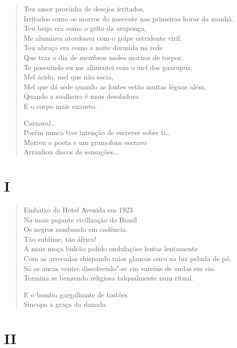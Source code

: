 \begin{verse}
Teu amor provinha de desejos irritados,\\
Irritados como os morros do nascente nas primeiras horas da manhã.\\
Teu beijo era como o grito da araponga,\\
Me alumiava atordoava com o golpe estridente viril.\\
Teu abraço era como a noite dormida na rede\\
Que traz o dia de membros moles mornos de torpor.\\
Te possuindo eu me alimentei com o mel dos guarupus,\\
Mel ácido, mel que não sacia,\\
Mel que dá sede quando as fontes estão muitas léguas além,\\
Quando a soalheira é mais desoladora\\
E o corpo mais exausto.

Carnaval\ldots{}\\
Porém nunca tive intenção de escrever sobre ti\ldots{}\\
Morreu o poeta e um gramofone escravo\\
Arranhou discos de sensações\ldots{}
\end{verse}

\medskip
\section*{I}

\begin{verse}
Embaixo do Hotel Avenida em 1923\\
Na mais pujante civilização do Brasil\\
Os negros sambando em cadência.\\
Tão sublime, tão áfrica!\\
A mais moça bulcão polido ondulações lentas lentamente\\
Com as arrecadas chispando raios glaucos ouro na luz peluda de pó.\\
Só as ancas ventre dissolvendo"-se em vaivéns de ondas em cio.\\
Termina se benzendo religiosa talqualmente num ritual.

E o bombo gargalhante de tostões\\
Sincopa a graça da danada.
\end{verse}

\medskip
\section*{II}

